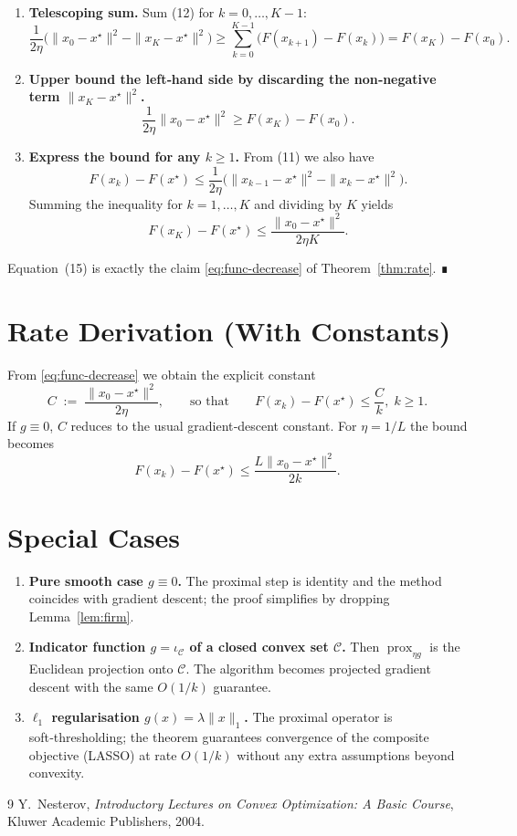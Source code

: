 \documentclass{article}
\begin{document}
\begin{enumerate}
\item[Step 13.] \textbf{Telescoping sum.}  
Sum (12) for $k=0,\dots, K-1$:
\[
\frac{1}{2\eta}\bigl(\|x_{0}-x^{\star}\|^{2}
                     -\|x_{K}-x^{\star}\|^{2}\bigr)
\ge \sum_{k=0}^{K-1}\bigl(F(x_{k+1})-F(x_{k})\bigr)
=F(x_{K})-F(x_{0}). \tag{13}
\]

\item[Step 14.] \textbf{Upper bound the left‑hand side by discarding the non‑negative term $\|x_{K}-x^{\star}\|^{2}$.}
\[
\frac{1}{2\eta}\|x_{0}-x^{\star}\|^{2}\ge F(x_{K})-F(x_{0}). \tag{14}
\]

\item[Step 15.] \textbf{Express the bound for any $k\ge 1$.}  
From (11) we also have
\[
F(x_{k})-F(x^{\star})\le\frac{1}{2\eta}\bigl(\|x_{k-1}-x^{\star}\|^{2}
                                 -\|x_{k}-x^{\star}\|^{2}\bigr).
\]
Summing the inequality for $k=1,\dots,K$ and dividing by $K$ yields
\[
F(x_{K})-F(x^{\star})\le\frac{\|x_{0}-x^{\star}\|^{2}}{2\eta K}. \tag{15}
\]

\end{enumerate}
Equation~(15) is exactly the claim \eqref{eq:func-decrease} of Theorem~\ref{thm:rate}. ∎

\section*{Rate Derivation (With Constants)}
From \eqref{eq:func-decrease} we obtain the explicit constant
\[
C\;:=\;\frac{\|x_{0}-x^{\star}\|^{2}}{2\eta},
\qquad\text{so that}\qquad
F(x_{k})-F(x^{\star})\le \frac{C}{k},\;k\ge1.
\]
If $g\equiv0$, $C$ reduces to the usual gradient‑descent constant. For $\eta=1/L$ the bound becomes
\[
F(x_{k})-F(x^{\star})\le \frac{L\|x_{0}-x^{\star}\|^{2}}{2k}.
\]

\section*{Special Cases}
\begin{enumerate}[label={\bf(S\arabic*)}]
\item \textbf{Pure smooth case $g\equiv0$.} The proximal step is identity and the method coincides with gradient descent; the proof simplifies by dropping Lemma~\ref{lem:firm}.

\item \textbf{Indicator function $g=\iota_{\mathcal{C}}$ of a closed convex set $\mathcal{C}$.} Then $\operatorname{prox}_{\eta g}$ is the Euclidean projection onto $\mathcal{C}$. The algorithm becomes projected gradient descent with the same $O(1/k)$ guarantee.

\item \textbf{$\ell_{1}$ regularisation $g(x)=\lambda\|x\|_{1}$.} The proximal operator is soft‑thresholding; the theorem guarantees convergence of the composite objective (LASSO) at rate $O(1/k)$ without any extra assumptions beyond convexity.

\end{enumerate}

\begin{thebibliography}{9}
Y.~Nesterov, \emph{Introductory Lectures on Convex Optimization: A Basic Course}, Kluwer Academic Publishers, 2004.
\end{thebibliography}
\end{document}
